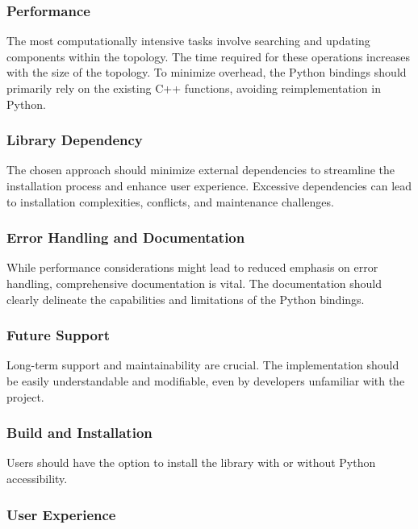 \subsubsection{Performance}

The most computationally intensive tasks involve searching and updating components within the topology. The time required for these operations increases with the size of the topology. To minimize overhead, the Python bindings should primarily rely on the existing C++ functions, avoiding reimplementation in Python.

\subsubsection{Library Dependency}

The chosen approach should minimize external dependencies to streamline the installation process and enhance user experience. Excessive dependencies can lead to installation complexities, conflicts, and maintenance challenges.

\subsubsection{Error Handling and Documentation}

While performance considerations might lead to reduced emphasis on error handling, comprehensive documentation is vital. The documentation should clearly delineate the capabilities and limitations of the Python bindings.

\subsubsection{Future Support}

Long-term support and maintainability are crucial. The implementation should be easily understandable and modifiable, even by developers unfamiliar with the project.

\subsubsection{Build and Installation}

Users should have the option to install the library with or without Python accessibility.

\subsubsection{User Experience}

